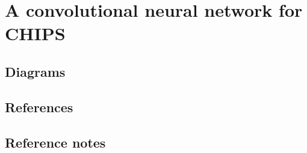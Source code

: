 \chapter{A convolutional neural network for CHIPS}
\label{chap:cvn}




\section{Diagrams}


\section{References}


\section{Reference notes}